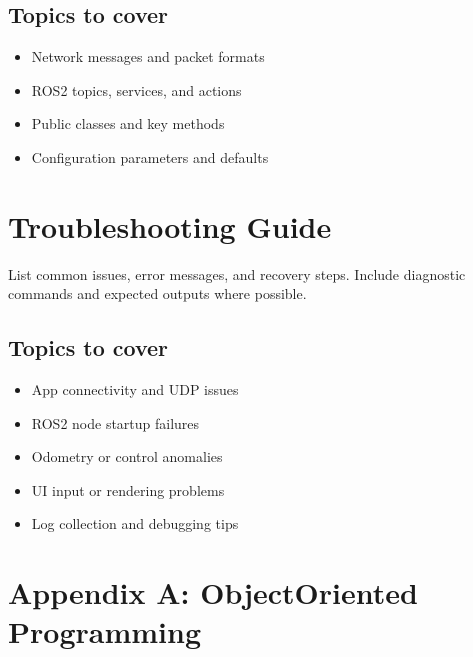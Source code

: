 \documentclass[letterpaper,10pt,english]{sphinxmanual}
\begin{document}
\section{Topics to cover}
\label{\detokenize{api_reference:topics-to-cover}}\begin{itemize}
\item {} 
\sphinxAtStartPar
Network messages and packet formats

\item {} 
\sphinxAtStartPar
ROS2 topics, services, and actions

\item {} 
\sphinxAtStartPar
Public classes and key methods

\item {} 
\sphinxAtStartPar
Configuration parameters and defaults

\end{itemize}


\chapter{Troubleshooting Guide}
\label{\detokenize{troubleshooting_guide:troubleshooting-guide}}\label{\detokenize{troubleshooting_guide::doc}}
\sphinxAtStartPar
List common issues, error messages, and recovery steps. Include diagnostic
commands and expected outputs where possible.


\section{Topics to cover}
\label{\detokenize{troubleshooting_guide:topics-to-cover}}\begin{itemize}
\item {} 
\sphinxAtStartPar
App connectivity and UDP issues

\item {} 
\sphinxAtStartPar
ROS2 node startup failures

\item {} 
\sphinxAtStartPar
Odometry or control anomalies

\item {} 
\sphinxAtStartPar
UI input or rendering problems

\item {} 
\sphinxAtStartPar
Log collection and debugging tips

\end{itemize}


\chapter{Appendix A: Object\sphinxhyphen{}Oriented Programming}
\label{\detokenize{appendix_a_object_oriented_programming:appendix-a-object-oriented-programming}}\label{\detokenize{appendix_a_object_oriented_programming::doc}}
\end{document}
